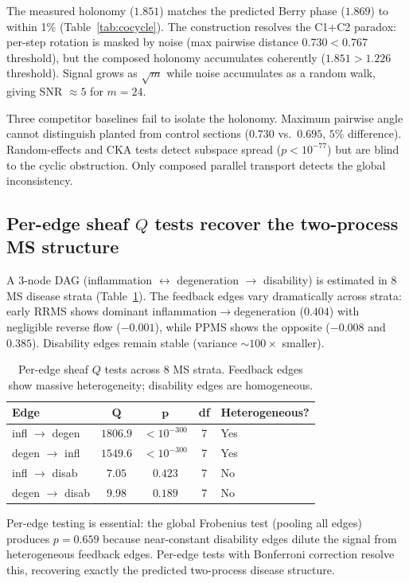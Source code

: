 \documentclass[11pt]{article}
\begin{document}
The measured holonomy ($1.851$) matches the predicted Berry phase ($1.869$) to within 1\% (Table~\ref{tab:cocycle}).
The construction resolves the C1+C2 paradox: per-step rotation is masked by noise (max pairwise distance $0.730 < 0.767$ threshold), but the composed holonomy accumulates coherently ($1.851 > 1.226$ threshold).
Signal grows as $\sqrt{m}$ while noise accumulates as a random walk, giving SNR $\approx 5$ for $m = 24$.

Three competitor baselines fail to isolate the holonomy.
Maximum pairwise angle cannot distinguish planted from control sections ($0.730$ vs.\ $0.695$, $5\%$ difference).
Random-effects and CKA tests detect subspace spread ($p < 10^{-77}$) but are blind to the cyclic obstruction.
Only composed parallel transport detects the global inconsistency.

\subsection{Per-edge sheaf $Q$ tests recover the two-process MS structure}
\label{sec:res-dag}

A 3-node DAG (inflammation $\leftrightarrow$ degeneration $\to$ disability) is estimated in 8 MS disease strata (Table~\ref{tab:dag}).
The feedback edges vary dramatically across strata: early RRMS shows dominant inflammation$\to$degeneration ($0.404$) with negligible reverse flow ($-0.001$), while PPMS shows the opposite ($-0.008$ and $0.385$).
Disability edges remain stable (variance $\sim\!100\times$ smaller).

\begin{table}[t]
\centering
\caption{Per-edge sheaf $Q$ tests across 8 MS strata. Feedback edges show massive heterogeneity; disability edges are homogeneous.}
\label{tab:dag}
\small
\begin{tabular}{@{}lcccl@{}}
\toprule
\textbf{Edge} & $\boldsymbol{Q}$ & $\boldsymbol{p}$ & \textbf{df} & \textbf{Heterogeneous?} \\
\midrule
infl $\to$ degen & $1806.9$ & $< 10^{-300}$ & 7 & Yes \\
degen $\to$ infl & $1549.6$ & $< 10^{-300}$ & 7 & Yes \\
infl $\to$ disab & $7.05$ & $0.423$ & 7 & No \\
degen $\to$ disab & $9.98$ & $0.189$ & 7 & No \\
\bottomrule
\end{tabular}
\end{table}

Per-edge testing is essential: the global Frobenius test (pooling all edges) produces $p = 0.659$ because near-constant disability edges dilute the signal from heterogeneous feedback edges.
Per-edge tests with Bonferroni correction resolve this, recovering exactly the predicted two-process disease structure.
\end{document}
